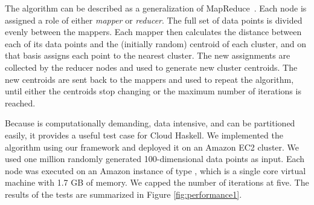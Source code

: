 \documentclass[preprint]{sigplanconf}
\begin{document}
The \kmeans{} algorithm can be described as a generalization of MapReduce~\cite{MapReduce2008}. Each node is assigned a role of either {\em mapper} or {\em reducer}. The full set of data points is divided evenly between the mappers. Each mapper then calculates the distance between each of its data points and the (initially random) centroid of each cluster, and on that basis assigns each point to the nearest cluster. The new assignments are collected by the reducer nodes and used to generate new cluster centroids. The new centroids are sent back to the mappers and used to repeat the algorithm, until either the centroids stop changing or the maximum number of iterations is reached.

Because \kmeans{} is computationally demanding, data intensive, and can be partitioned easily,  it provides a useful test case for Cloud Haskell. We implemented the \kmeans{} algorithm using our framework and deployed it on an Amazon EC2 cluster. We used one million randomly generated 100-dimensional data points as input. Each node was executed on an Amazon instance of type , which is a single core virtual machine with 1.7 GB of memory. We capped the number of iterations at five. The results of the tests are summarized in Figure \ref{fig:performance1}.
\end{document}
